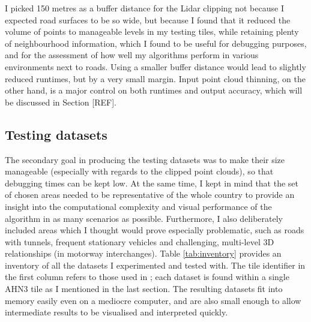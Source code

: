 I picked 150 metres as a buffer distance for the Lidar clipping not because I expected road surfaces to be so wide, but because I found that it reduced the volume of points to manageable levels in my testing tiles, while retaining plenty of neighbourhood information, which I found to be useful for debugging purposes, and for the assessment of how well my algorithms perform in various environments next to roads. Using a smaller buffer distance would lead to slightly reduced runtimes, but by a very small margin. Input point cloud thinning, on the other hand, is a major control on both runtimes and output accuracy, which will be discussed in Section [REF].

\subsection{Testing datasets}
\label{sub:testingdata}

The secondary goal in producing the testing datasets was to make their size manageable (especially with regards to the clipped point clouds), so that debugging times can be kept low. At the same time, I kept in mind that the set of chosen areas needed to be representative of the whole country to provide an insight into the computational complexity and visual performance of the algorithm in as many scenarios as possible. Furthermore, I also deliberately included areas which I thought would prove especially problematic, such as roads with tunnels, frequent stationary vehicles and challenging, multi-level 3D relationships (in motorway interchanges). Table \ref{tab:inventory} provides an inventory of all the datasets I experimented and tested with. The tile identifier in the first column refers to those used in \cite{ahn3_download}; each dataset is found within a single AHN3 tile as I mentioned in the last section. The resulting datasets fit into memory easily even on a mediocre computer, and are also small enough to allow intermediate results to be visualised and interpreted quickly.

